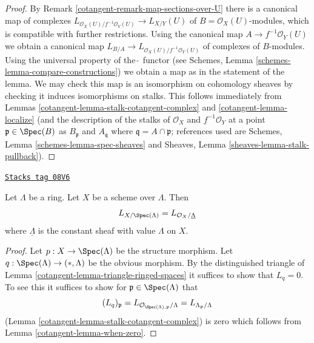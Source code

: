 \begin{proof}

By Remark \ref{cotangent-remark-map-sections-over-U}
there is a canonical map of complexes
$L_{\mathcal{O}_X(U)/f^{-1}\mathcal{O}_Y(U)} \to L_{X/Y}(U)$
of $B = \mathcal{O}_X(U)$-modules, which is compatible
with further restrictions. Using the canonical map
$A \to f^{-1}\mathcal{O}_Y(U)$ we obtain a canonical map
$L_{B/A} \to L_{\mathcal{O}_X(U)/f^{-1}\mathcal{O}_Y(U)}$
of complexes of $B$-modules.
Using the universal property of the $\widetilde{\ }$
functor (see Schemes, Lemma \ref{schemes-lemma-compare-constructions})
we obtain a map as in the statement of the lemma.
We may check this map is an isomorphism on cohomology sheaves
by checking it induces isomorphisms on stalks.
This follows immediately from
Lemmas \ref{cotangent-lemma-stalk-cotangent-complex} and \ref{cotangent-lemma-localize}
(and the description of the stalks of
$\mathcal{O}_X$ and $f^{-1}\mathcal{O}_Y$
at a point $\mathfrak p \in \Spec(B)$ as $B_\mathfrak p$ and
$A_\mathfrak q$ where $\mathfrak q = A \cap \mathfrak p$; references
used are Schemes, Lemma \ref{schemes-lemma-spec-sheaves}
and
Sheaves, Lemma \ref{sheaves-lemma-stalk-pullback}).
\end{proof}

\begin{lemma}
\label{cotangent-lemma-scheme-over-ring}
\href{https://stacks.math.columbia.edu/tag/08V6}{\texttt{Stacks tag 08V6}}

Let $\Lambda$ be a ring. Let $X$ be a scheme over $\Lambda$.
Then
$$
L_{X/\Spec(\Lambda)} = L_{\mathcal{O}_X/\underline{\Lambda}}
$$
where $\underline{\Lambda}$ is the constant sheaf with value
$\Lambda$ on $X$.
\end{lemma}

\begin{proof}

Let $p : X \to \Spec(\Lambda)$ be the structure morphism.
Let $q : \Spec(\Lambda) \to (*, \Lambda)$ be the obvious morphism.
By the distinguished triangle of Lemma \ref{cotangent-lemma-triangle-ringed-spaces}
it suffices to show that $L_q = 0$. To see this it suffices to
show for $\mathfrak p \in \Spec(\Lambda)$ that
$$
(L_q)_\mathfrak p =
L_{\mathcal{O}_{\Spec(\Lambda), \mathfrak p}/\Lambda} =
L_{\Lambda_\mathfrak p/\Lambda}
$$
(Lemma \ref{cotangent-lemma-stalk-cotangent-complex})
is zero which follows from Lemma \ref{cotangent-lemma-when-zero}.
\end{proof}

